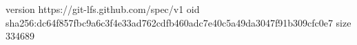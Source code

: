 version https://git-lfs.github.com/spec/v1
oid sha256:dc64f857fbc9a6c3f4e33ad762cdfb460adc7e40c5a49da3047f91b309cfc0e7
size 334689
